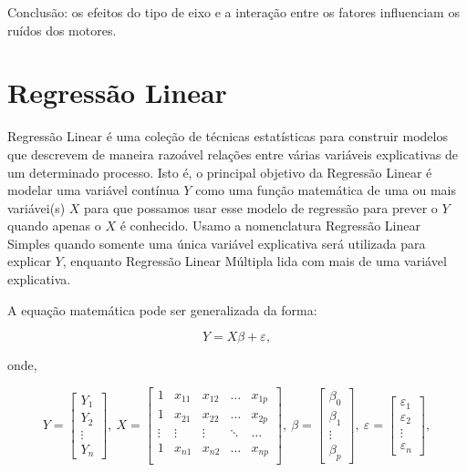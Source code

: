 \documentclass[
]{book}
\begin{document}
Conclusão: os efeitos do tipo de eixo e a interação entre os fatores influenciam os ruídos dos motores.

\hypertarget{regressuxe3o-linear}{%
\chapter{Regressão Linear}\label{regressuxe3o-linear}}

Regressão Linear é uma coleção de técnicas estatísticas para construir modelos que descrevem de maneira razoável relações entre várias variáveis explicativas de um determinado processo. Isto é, o principal objetivo da Regressão Linear é modelar uma variável contínua \(Y\) como uma função matemática de uma ou mais variávei(s) \(X\) para que possamos usar esse modelo de regressão para prever o \(Y\) quando apenas o \(X\) é conhecido. Usamo a nomenclatura Regressão Linear Simples quando somente uma única variável explicativa será utilizada para explicar \(Y\), enquanto Regressão Linear Múltipla lida com mais de uma variável explicativa.

A equação matemática pode ser generalizada da forma:

\[Y=X\beta+\varepsilon,\]

onde,

\[Y = \left[\begin{array}{r}
Y_1       \\
Y_2    \\
\vdots \\
Y_n    \end{array}\right], ~ X = \left[\begin{array}{rrrrr}
1 & x_{11} & x_{12} & \ldots & x_{1p} \\
1 & x_{21} & x_{22} & \ldots & x_{2p} \\
\vdots & \vdots & \vdots & \ddots & \ldots \\
1 & x_{n1} & x_{n2} & \ldots & x_{np} \\
\end{array}\right], ~ \beta = \left[\begin{array}{r}
\beta_0       \\
\beta_1    \\
\vdots \\
\beta_p    \end{array}\right], ~ \varepsilon = \left[\begin{array}{r}
\varepsilon_1       \\
\varepsilon_2    \\
\vdots \\
\varepsilon_n \end{array}\right],\]
\end{document}
